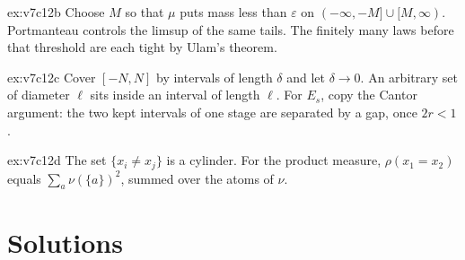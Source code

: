 \begin{hint}{ex:v7c12b}
Choose $M$ so that $\mu$ puts mass less than $\varepsilon$ on $(-\infty,-M]\cup[M,\infty)$. Portmanteau controls the limsup of the same tails. The
finitely many laws before that threshold are each tight by Ulam's theorem.
\end{hint}
\begin{hint}{ex:v7c12c}
Cover $[-N,N]$ by intervals of length $\delta$ and let $\delta\to 0$. An arbitrary set of diameter $\ell$ sits inside an interval of length
$\ell$. For $E_s$, copy the Cantor argument: the two kept intervals of one stage are separated by a gap, once $2r<1$.
\end{hint}
\begin{hint}{ex:v7c12d}
The set $\{x_i\ne x_j\}$ is a cylinder. For the product measure, $\rho(x_1=x_2)$ equals $\sum_a\nu(\{a\})^2$, summed over the atoms of $\nu$.
\end{hint}

\section{Solutions}

